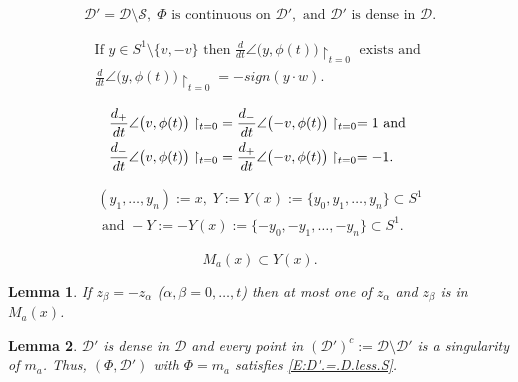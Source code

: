 \documentclass[10pt,a4paper]{amsart}
\newtheorem{lemma}{Lemma}
\newcommand{\D}{\mathcal{D}}
\newcommand{\Ss}{\mathcal{S}}
\begin{document}
   \begin{equation}  \label{E:D'.=.D.less.S}
      \D' = \D \setminus \Ss, \; \Phi \text{ is continuous on } \D', 
        \text{ and $\D'$ is dense in $\D$}.
   \end{equation} 



	\begin{multline}  \label{E:angle.deriv.sign}
		\text{If } y \in S^{1} \setminus \{ v, -v \} \text{ then } 
		  \frac{d}{dt} \angle \bigl( y,\phi(t) \bigr) \restriction_{t=0} \text{ exists and } \\
		    \frac{d}{dt} \angle \bigl( y,\phi(t) \bigr) \restriction_{t=0} = -sign(y \cdot w).
	\end{multline}  

    \begin{align} \label{E:one-sided.angle.derivs}
      \frac{d_{+}}{dt} \angle \bigl( v,\phi(t) \bigr) \restriction_{t=0} 
        &= \frac{d_{-}}{dt} \angle \bigl( -v,\phi(t) \bigr) \restriction_{t=0} = 1 \text{ and } \\
      \frac{d_{-}}{dt} \angle \bigl( v,\phi(t) \bigr) \restriction_{t=0} 
        &= \frac{d_{+}}{dt} \angle \bigl( -v,\phi(t) \bigr) \restriction_{t=0} = -1 . \notag
    \end{align}

	\begin{multline} \label{E:Y(x).defn}
	     (y_{1}, \ldots, y _{n}) := x, \;
		  Y := Y(x)  := \{ y_{0}, y_{1}, \ldots, y_{n} \} \subset S^{1} \\
		           \text{ and } - Y := -Y(x) := \{ -y_{0}, -y_{1}, \ldots, -y_{n} \} \subset S^{1}.
	\end{multline}

	\begin{equation} \label{E:Ma(x).in.Y}
		M_{a}(x) \subset Y(x).
	\end{equation}

  \begin{lemma} \label{L:not.both.antipodals.in.Ma}
If $z_{\beta} = -z_{\alpha}$ ($\alpha, \beta = 0, \ldots, t$) then at most 
one of $z_{\alpha} $ and $z_{\beta}$ is in $M_{a}(x)$.
  \end{lemma}

  \begin{lemma} \label{L:D'.is.dense.for.aug.median}
$\D'$ is dense in $\D$ and every point in $(\D')^{c} := \D \setminus \D'$ is a singularity of $m_{a}$. Thus, $(\Phi, \D')$ with $\Phi = m_{a}$ satisfies \eqref{E:D'.=.D.less.S}.
  \end{lemma}
\end{document}
